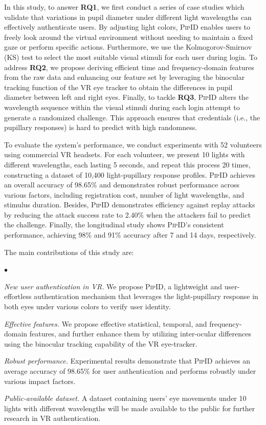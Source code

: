 \documentclass[sigconf]{acmart}
\newcommand{\sysname}{\textsc{PipID}\xspace}
\newenvironment{packeditemize}{
\begin{list}{$\bullet$}{
\setlength{\labelwidth}{8pt}
\setlength{\itemsep}{2pt}
\setlength{\leftmargin}{\labelwidth}
\addtolength{\leftmargin}{\labelsep}
\setlength{\parindent}{0pt}
\setlength{\listparindent}{\parindent}
\setlength{\parsep}{0pt}
\setlength{\topsep}{3pt}}}{\end{list}}
\begin{document}
In this study, to answer \textbf{RQ1}, we first conduct a series of case studies which validate that variations in pupil diameter under different light wavelengths can effectively authenticate users. By adjusting light colors, \sysname enables users to freely look around the virtual environment without needing to maintain a fixed gaze or perform specific actions. Furthermore, we use the Kolmogorov-Smirnov (KS) test to select the most suitable visual stimuli for each user during login.
To address \textbf{RQ2}, we propose deriving efficient time and frequency-domain features from the raw data and enhancing our feature set by leveraging the binocular tracking function of the VR eye tracker to obtain the differences in pupil diameter between left and right eyes.
Finally, to tackle \textbf{RQ3}, \sysname alters the wavelength sequence within the visual stimuli during each login attempt to generate a randomized challenge. This approach ensures that credentials (i.e., the pupillary responses) is hard to predict with high randomness.

To evaluate the system's performance, we conduct experiments with 52 volunteers using commercial VR headsets. For each volunteer, we present 10 lights with different wavelengths, each lasting 5 seconds, and repeat this process 20 times, constructing a dataset of 10,400 light-pupillary response profiles. \sysname achieves an overall accuracy of 98.65\% and demonstrates robust performance across various factors, including registration cost, number of light wavelengths, and stimulus duration. Besides, \sysname demonstrates efficiency against replay attacks by reducing the attack success rate to 2.40\% when the attackers fail to predict the challenge. Finally, the longitudinal study shows \sysname's consistent performance, achieving 98\% and 91\% accuracy after 7 and 14 days, respectively.

The main contributions of this study are:
\begin{packeditemize}
    \item \textit{New user authentication in VR.} We propose \sysname, a lightweight and user-effortless authentication mechanism that leverages the light-pupillary response in both eyes under various colors to verify user identity.
    \item \textit{Effective features.} We propose effective statistical, temporal, and frequency-domain features, and further enhance them by utilizing inter-ocular differences using the binocular tracking capability of the VR eye-tracker.
    \item \textit{Robust performance.} Experimental results demonstrate that \sysname achieves an average accuracy of 98.65\% for user authentication and performs robustly under various impact factors.
    \item \textit{Public-available dataset.} A dataset containing users' eye movements under 10 lights with different wavelengths will be made available to the public for further research in VR authentication.
\end{packeditemize}
\end{document}

